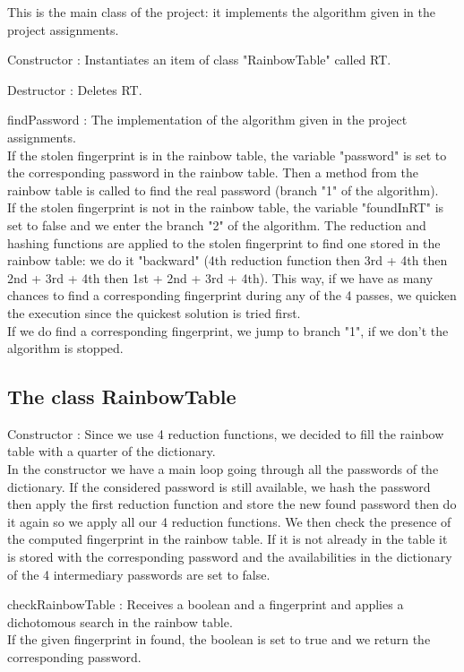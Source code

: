 \documentclass[11pt,a4paper]{article}
\begin{document}
This is the main class of the project: it implements the algorithm given in the project assignments. \\
\item[Constructor :] Instantiates an item of class "RainbowTable" called RT.
\item[Destructor :] Deletes RT.
\item[findPassword :] The implementation of the algorithm given in the project assignments.\\ 
If the stolen fingerprint is in the rainbow table, the variable "password" is set to the corresponding password in the rainbow table. Then a method from the rainbow table is called to find the real password (branch "1" of the algorithm). \\
If the stolen fingerprint is not in the rainbow table, the variable "foundInRT" is set to false and we enter the branch "2" of the algorithm. The reduction and hashing functions are applied to the stolen fingerprint to find one stored in the rainbow table: we do it "backward" (4th reduction function then 3rd + 4th then 2nd + 3rd + 4th then 1st + 2nd + 3rd + 4th). This way, if we have as many chances to find a corresponding fingerprint during any of the 4 passes, we quicken the execution since the quickest solution is tried first. \\ If we do find a corresponding fingerprint, we jump to branch "1", if we don't the algorithm is stopped. \\

\subsection{The class RainbowTable}

\item[Constructor :] Since we use 4 reduction functions, we decided to fill the rainbow table with a quarter of the dictionary. \\ In the constructor we have a main loop going through all the passwords of the dictionary.
If the considered password is still available, we hash the password then apply the first reduction function and store the new found password then do it again so we apply all our 4 reduction functions. We then check the presence of the computed fingerprint in the rainbow table. If it is not already in the table it is stored with the corresponding password and the availabilities in the dictionary of the 4 intermediary passwords are set to false. 

\item[checkRainbowTable :] Receives a boolean and a fingerprint and applies a dichotomous search in the rainbow table. \\
If the given fingerprint in found, the boolean is set to true and we return the corresponding password. \\
\end{document}
